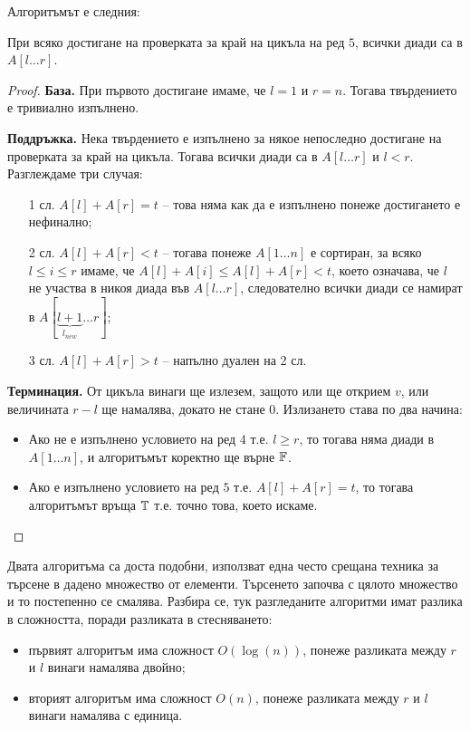 \newpage

Алгоритъмът е следния:


\begin{invariant}
    При всяко достигане на проверката за край на цикъла на ред $5$, всички диади са в $A[l \dots r]$.
\end{invariant}

\begin{proof}
    \phantom{1}

    \textbf{База.}
    При първото достигане имаме, че $l = 1$ и $r = n$.
    Тогава твърдението е тривиално изпълнено.

    \textbf{Поддръжка.}
    Нека твърдението е изпълнено за някое непоследно достигане на проверката за край на цикъла.
    Тогава всички диади са в $A[l \dots r]$ и $l < r$.
    Разглеждаме три случая:
    \begin{itemize}
        \item[1 сл.] $A[l] + A[r] = t$ -- това няма как да е изпълнено понеже достигането е нефинално;
        \item[2 сл.] $A[l] + A[r] < t$ -- тогава понеже $A[1 \dots n]$ е сортиран, за всяко $l \leq i \leq r$ имаме, че $A[l] + A[i] \leq A[l] + A[r] < t$, което означава, че $l$ не участва в никоя диада във $A[l \dots r]$, следователно всички диади се намират в $A[\underbrace{l + 1}_{l_{new}} \dots r]$;
        \item[3 сл.] $A[l] + A[r] > t$ -- напълно дуален на 2 сл.
    \end{itemize}

    \textbf{Терминация.}
    От цикъла винаги ще излезем, защото или ще открием $v$, или величината $r - l$ ще намалява, докато не стане $0$.
    Излизането става по два начина:
    \begin{itemize}
        \item Ако не е изпълнено условието на ред $4$ т.е. $l \geq r$, то тогава няма диади в $A[1 \dots n]$, и алгоритъмът коректно ще върне $\mathbb{F}$.
        \item Ако е изпълнено условието на ред $5$ т.е. $A[l] + A[r] = t$, то тогава алгоритъмът връща $\mathbb{T}$ т.е. точно това, което искаме.
    \end{itemize}
\end{proof}

Двата алгоритъма са доста подобни, използват една често срещана техника за търсене в дадено множество от елементи.
Търсенето започва с цялото множество и то постепенно се смалява.
Разбира се, тук разгледаните алгоритми имат разлика в сложността, поради разликата в стесняването:
\begin{itemize}
    \item първият алгоритъм има сложност $O(\log(n))$, понеже разликата между $r$ и $l$ винаги намалява двойно;
    \item вторият алгоритъм има сложност $O(n)$, понеже разликата между $r$ и $l$ винаги намалява с единица.
\end{itemize}